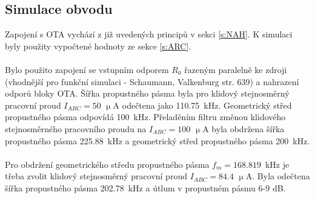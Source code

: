 \subsection{Simulace obvodu}
\noindent  Zapojení s OTA vychází z již uvedených principů v sekci \ref{s:NAH}. K simulaci byly použity vypočtené hodnoty ze sekce \ref{s:ARC}. \\
\\
\noindent Bylo použito zapojení se vstupním odporem $R_0$ řazeným paralelně ke zdroji (vhodnější pro funkční simulaci - Schaumann, Valkenburg \cite{13} str. 639) a nahrazení odporů bloky OTA. Šířka propustného pásma byla pro klidový stejnosměrný pracovní proud $I_{ABC} = 50$ $\upmu$A odečtena jako 110.75~kHz. Geometrický střed propustného pásma odpovídá 100~kHz. Přeladěním filtru změnou klidového stejnosměrného pracovního proudu na $I_{ABC} = 100$ $\upmu$A byla obdržena šířka propustného pásma 225.88~kHz a geometrický střed propustného pásma 200~kHz. \\
\\
Pro obdržení geometrického středu propustného pásma $f_m = 168.819$~kHz je třeba zvolit klidový stejnosměrný pracovní proud $I_{ABC} = 84.4$ $\upmu$A. Byla odečtena šířka propustného pásma 202.78~kHz a útlum v propustném pásmu 6-9 dB. 
